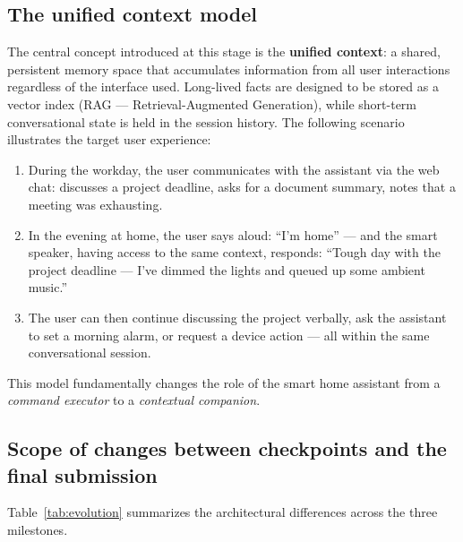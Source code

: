 \documentclass[a4paper,12pt]{article}
\begin{document}
\subsection{The unified context model}

The central concept introduced at this stage is the \textbf{unified context}: a shared, persistent memory space that accumulates information from all user interactions regardless of the interface used. Long-lived facts are designed to be stored as a vector index (RAG --- Retrieval-Augmented Generation), while short-term conversational state is held in the session history. The following scenario illustrates the target user experience:

\begin{enumerate}
  \item During the workday, the user communicates with the assistant via the web chat: discusses a project deadline, asks for a document summary, notes that a meeting was exhausting.
  \item In the evening at home, the user says aloud: ``I'm home'' --- and the smart speaker, having access to the same context, responds: ``Tough day with the project deadline --- I've dimmed the lights and queued up some ambient music.''
  \item The user can then continue discussing the project verbally, ask the assistant to set a morning alarm, or request a device action --- all within the same conversational session.
\end{enumerate}

This model fundamentally changes the role of the smart home assistant from a \emph{command executor} to a \emph{contextual companion}.

\subsection{Scope of changes between checkpoints and the final submission}

Table~\ref{tab:evolution} summarizes the architectural differences across the three milestones.
\end{document}
